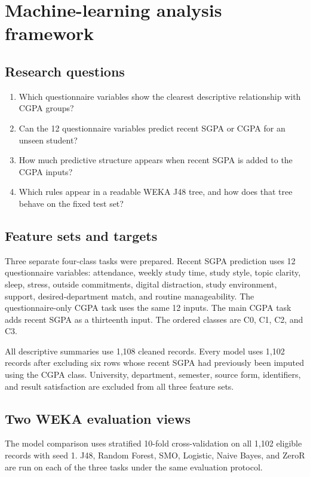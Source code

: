 \section{Machine-learning analysis framework}
\subsection{Research questions}
\begin{enumerate}
\item Which questionnaire variables show the clearest descriptive relationship with CGPA groups?
\item Can the 12 questionnaire variables predict recent SGPA or CGPA for an unseen student?
\item How much predictive structure appears when recent SGPA is added to the CGPA inputs?
\item Which rules appear in a readable WEKA J48 tree, and how does that tree behave on the fixed test set?
\end{enumerate}

\subsection{Feature sets and targets}
Three separate four-class tasks were prepared. Recent SGPA prediction uses 12 questionnaire variables: attendance, weekly study time, study style, topic clarity, sleep, stress, outside commitments, digital distraction, study environment, support, desired-department match, and routine manageability. The questionnaire-only CGPA task uses the same 12 inputs. The main CGPA task adds recent SGPA as a thirteenth input. The ordered classes are C0, C1, C2, and C3.

All descriptive summaries use 1,108 cleaned records. Every model uses 1,102 records after excluding six rows whose recent SGPA had previously been imputed using the CGPA class. University, department, semester, source form, identifiers, and result satisfaction are excluded from all three feature sets.

\subsection{Two WEKA evaluation views}
The model comparison uses stratified 10-fold cross-validation on all 1,102 eligible records with seed 1. J48, Random Forest, SMO, Logistic, Naive Bayes, and ZeroR are run on each of the three tasks under the same evaluation protocol.

